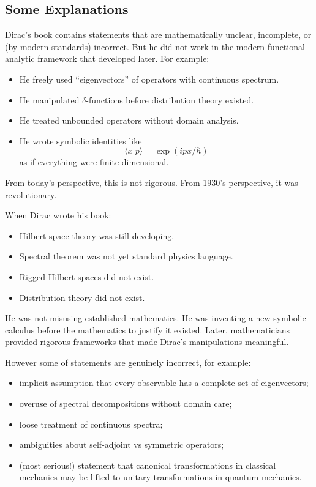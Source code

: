 \subsection{Some Explanations}
\label{some-explanations}

Dirac's book \cite{dirac-pqm} contains
statements that are mathematically unclear, incomplete, or (by modern standards) incorrect. 
But he did not work in the modern functional-analytic framework that developed later.
For example:
\begin{itemize}
   \item He freely used “eigenvectors” of operators with continuous spectrum.
    \item He manipulated $ \delta $-functions before distribution theory existed.
    \item He treated unbounded operators without domain analysis.
    \item He wrote symbolic identities like \[ \langle x|p \rangle=\exp(i p x/\hbar) \]
as if everything were finite-dimensional.
\end{itemize}
From today’s perspective, this is not rigorous.
From 1930’s perspective, it was revolutionary.

When Dirac wrote his book:
\begin{itemize}
   \item Hilbert space theory was still developing.
\item Spectral theorem was not yet standard physics language.
\item Rigged Hilbert spaces did not exist.
\item Distribution theory did not exist.
\end{itemize}
He was not misusing established mathematics.
He was inventing a new symbolic calculus before the mathematics to justify it existed.
Later, mathematicians 
provided rigorous frameworks that made Dirac’s manipulations meaningful.

However some of statements are genuinely incorrect, for example:
\begin{itemize}
   \item implicit assumption that every observable has a complete set of eigenvectors;
\item overuse of spectral decompositions without domain care;
\item loose treatment of continuous spectra;
\item ambiguities about self-adjoint vs symmetric operators;
\item (most serious!) statement that canonical transformations in classical mechanics 
    may be lifted to unitary transformations in quantum mechanics.
\end{itemize}

